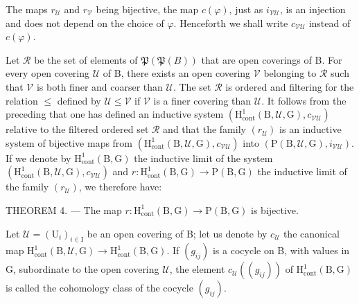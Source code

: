 The maps \(r_{\mathcal{U}}\) and \(r_{\mathcal{V}}\) being bijective, the map \(c(\varphi)\), just as \(i_{\mathcal{V}\mathcal{U}}\), is an injection and does not depend on the choice of \(\varphi\). Henceforth we shall write \(c_{\mathcal{V}\mathcal{U}}\) instead of \(c(\varphi)\).

Let \(\mathcal{R}\) be the set of elements of \(\mathfrak{P}(\mathfrak{P}(B))\) that are open coverings of B. For every open covering \(\mathcal{U}\) of B, there exists an open covering \(\mathcal{V}\) belonging to \(\mathcal{R}\) such that \(\mathcal{V}\) is both finer and coarser than \(\mathcal{U}\). The set \(\mathcal{R}\) is ordered and filtering for the relation \(\leqslant\) defined by \(\mathcal{U} \leqslant \mathcal{V}\) if \(\mathcal{V}\) is a finer covering than \(\mathcal{U}\). It follows from the preceding that one has defined an inductive system \((\mathrm{H}_{\mathrm{cont}}^{1}(\mathrm{B},\mathcal{U},\mathrm{G}),c_{\mathcal{V}\mathcal{U}})\) relative to the filtered ordered set \(\mathcal{R}\) and that the family \((r_{\mathcal{U}})\) is an inductive system of bijective maps from \((\mathrm{H}_{\mathrm{cont}}^{1}(\mathrm{B},\mathcal{U},\mathrm{G}),c_{\mathcal{V}\mathcal{U}})\) into \((\mathrm{P}(\mathrm{B},\mathcal{U},\mathrm{G}),i_{\mathcal{V}\mathcal{U}})\). If we denote by \(\mathrm{H}_{\mathrm{cont}}^{1}(\mathrm{B},\mathrm{G})\) the inductive limit of the system \((\mathrm{H}_{\mathrm{cont}}^{1}(\mathrm{B},\mathcal{U},\mathrm{G}),c_{\mathcal{V}\mathcal{U}})\) and \(r\colon \mathrm{H}_{\mathrm{cont}}^{1}(\mathrm{B},\mathrm{G})\to \mathrm{P}(\mathrm{B},\mathrm{G})\) the inductive limit of the family \((r_{\mathcal{U}})\), we therefore have:

THEOREM 4. --- The map \(r\colon \mathrm{H}_{\mathrm{cont}}^{1}(\mathrm{B},\mathrm{G})\to \mathrm{P}(\mathrm{B},\mathrm{G})\) is bijective.

Let \(\mathcal{U} = (\mathrm{U}_i)_{i\in \mathrm{I}}\) be an open covering of B; let us denote by \(c_{\mathcal{U}}\) the canonical map \(\mathrm{H}_{\mathrm{cont}}^{1}(\mathrm{B},\mathcal{U},\mathrm{G})\to \mathrm{H}_{\mathrm{cont}}^{1}(\mathrm{B},\mathrm{G})\). If \((g_{ij})\) is a cocycle on B, with values in G, subordinate to the open covering \(\mathcal{U}\), the element \(c_{\mathcal{U}}((g_{ij}))\) of \(\mathrm{H}_{\mathrm{cont}}^{1}(\mathrm{B},\mathrm{G})\) is called the cohomology class of the cocycle \((g_{ij})\).

